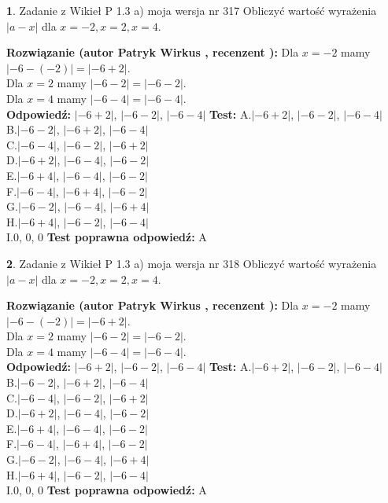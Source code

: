 \documentclass[12pt, a4paper]{article}
\theoremstyle{definition} %
\newtheorem{zad}{}
\newcommand{\zadStart}[1]{\begin{zad}#1\newline}
\newcommand{\zadStop}{\end{zad}}
\newcommand{\rozwStart}[2]{\noindent \textbf{Rozwiązanie (autor #1 , recenzent #2): }\newline}
\newcommand{\rozwStop}{\newline}
\newcommand{\odpStart}{\noindent \textbf{Odpowiedź:}\newline}
\newcommand{\odpStop}{\newline}
\newcommand{\testStart}{\noindent \textbf{Test:}\newline}
\newcommand{\testStop}{\newline}
\newcommand{\kluczStart}{\noindent \textbf{Test poprawna odpowiedź:}\newline}
\newcommand{\kluczStop}{\newline}
\begin{document}
\zadStart{Zadanie z Wikieł P 1.3 a) moja wersja nr 317}
Obliczyć wartość wyrażenia $|a - x|$ dla $x=-2,x=2,x=4$.
\zadStop
\rozwStart{Patryk Wirkus}{}
Dla $x = -2$ mamy $|-6 - (-2)| = |-6 + 2|$.\\
Dla $x = 2$ mamy $|-6 - 2| = |-6 - 2|$.\\
Dla $x = 4$ mamy $|-6 - 4| = |-6 - 4|$.\\
\rozwStop
\odpStart
$|-6 + 2|$, $|-6 - 2|$, $|-6 - 4|$
\odpStop
\testStart
A.$|-6 + 2|$, $|-6 - 2|$, $|-6 - 4|$\\
B.$|-6 - 2|$, $|-6 + 2|$, $|-6 - 4|$\\
C.$|-6 - 4|$, $|-6 - 2|$, $|-6 + 2|$\\
D.$|-6 + 2|$, $|-6 - 4|$, $|-6 - 2|$\\
E.$|-6 + 4|$, $|-6 - 4|$, $|-6 - 2|$\\
F.$|-6 - 4|$, $|-6 + 4|$, $|-6 - 2|$\\
G.$|-6 - 2|$, $|-6 - 4|$, $|-6 + 4|$\\
H.$|-6 + 4|$, $|-6 - 2|$, $|-6 - 4|$\\
I.$0$, $0$, $0$
\testStop
\kluczStart
A
\kluczStop



\zadStart{Zadanie z Wikieł P 1.3 a) moja wersja nr 318}
Obliczyć wartość wyrażenia $|a - x|$ dla $x=-2,x=2,x=4$.
\zadStop
\rozwStart{Patryk Wirkus}{}
Dla $x = -2$ mamy $|-6 - (-2)| = |-6 + 2|$.\\
Dla $x = 2$ mamy $|-6 - 2| = |-6 - 2|$.\\
Dla $x = 4$ mamy $|-6 - 4| = |-6 - 4|$.\\
\rozwStop
\odpStart
$|-6 + 2|$, $|-6 - 2|$, $|-6 - 4|$
\odpStop
\testStart
A.$|-6 + 2|$, $|-6 - 2|$, $|-6 - 4|$\\
B.$|-6 - 2|$, $|-6 + 2|$, $|-6 - 4|$\\
C.$|-6 - 4|$, $|-6 - 2|$, $|-6 + 2|$\\
D.$|-6 + 2|$, $|-6 - 4|$, $|-6 - 2|$\\
E.$|-6 + 4|$, $|-6 - 4|$, $|-6 - 2|$\\
F.$|-6 - 4|$, $|-6 + 4|$, $|-6 - 2|$\\
G.$|-6 - 2|$, $|-6 - 4|$, $|-6 + 4|$\\
H.$|-6 + 4|$, $|-6 - 2|$, $|-6 - 4|$\\
I.$0$, $0$, $0$
\testStop
\kluczStart
A
\kluczStop
\end{document}
